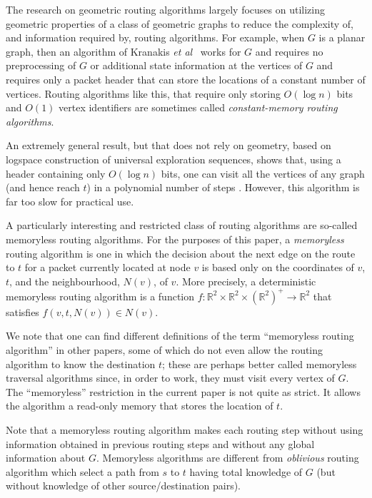\documentclass{elsarticle}
\newcommand{\R}{\mathbb{R}}
\newcommand{\etal}{\emph{et al}}
\begin{document}
The research on geometric routing algorithms largely focuses on
utilizing geometric properties of a class of geometric graphs to reduce
the complexity of, and information required by, routing algorithms.
For example, when $G$ is a planar graph, then an algorithm of Kranakis
\etal\ \cite{ksu99} works for $G$ and requires no preprocessing of $G$
or additional state information at the vertices of $G$ and requires only a
packet header that can store the locations of a constant number of vertices.
Routing algorithms like this, that require only storing $O(\log n)$ bits and $O(1)$ vertex identifiers are sometimes called \emph{constant-memory routing algorithms}.

An extremely general result, but that does not rely on geometry, based on logspace construction of universal exploration sequences, shows that, using a header containing only $O(\log n)$ bits, one can visit all the vertices of any graph (and hence reach $t$) in a polynomial number of steps \cite{r05}.  However, this algorithm is far too slow for practical use.

A particularly interesting and restricted class of routing algorithms are so-called memoryless routing algorithms.  For the purposes of this paper, a \emph{memoryless} routing algorithm is one in which the decision about the next edge on the route to $t$ for a packet currently located at node $v$ is based only on the coordinates of $v$, $t$, and the neighbourhood, $N(v)$, of $v$. More precisely, a deterministic memoryless routing algorithm is a function $f:\R^2\times\R^2\times(\R^2)^+\rightarrow \R^2$ that satisfies $f(v,t,N(v)) \in N(v)$.  

We note that one can find different definitions of the term ``memoryless routing algorithm'' in other papers, some of which do not even allow the routing algorithm to know the destination $t$; these are perhaps better called memoryless traversal algorithms since, in order to work, they must visit every vertex of $G$.  The ``memoryless'' restriction in the current paper is not quite as strict.  It allows the algorithm a read-only memory that stores the location of $t$.

Note that a memoryless routing algorithm makes each routing step without using information obtained in previous routing steps and without any global information about $G$.  Memoryless algorithms are different from \emph{oblivious} routing algorithm \cite[Section~4.2]{mr95} which select a path from $s$ to $t$ having total knowledge of $G$ (but without knowledge of other source/destination pairs).
 
\end{document}
